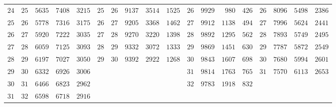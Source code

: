 \begin{GaussVISolarFrame}
\begin{tabular}{r|r|r|r|r||r|r|r|r|r||r|r|r|r||r|r|r|r}
$24$ & $25$ & $5635$ & $7408$ & $3215$ & $25$ & $26$ & $9137$ & $3514$ & $1525$ & $26$ & $9929$ & $980$ & $426$ & $26$ & $8096$ & $5498$ & $2386$\\
$25$ & $26$ & $5778$ & $7316$ & $3175$ & $26$ & $27$ & $9205$ & $3368$ & $1462$ & $27$ & $9912$ & $1138$ & $494$ & $27$ & $7996$ & $5624$ & $2441$\\
$26$ & $27$ & $5920$ & $7222$ & $3035$ & $27$ & $28$ & $9270$ & $3220$ & $1398$ & $28$ & $9892$ & $1295$ & $562$ & $28$ & $7893$ & $5749$ & $2495$\\
$27$ & $28$ & $6059$ & $7125$ & $3093$ & $28$ & $29$ & $9332$ & $3072$ & $1333$ & $29$ & $9869$ & $1451$ & $630$ & $29$ & $7787$ & $5872$ & $2549$\\
$28$ & $29$ & $6197$ & $7027$ & $3050$ & $29$ & $30$ & $9392$ & $2922$ & $1268$ & $30$ & $9843$ & $1607$ & $698$ & $30$ & $7680$ & $5994$ & $2601$\\[3pt]
$29$ & $30$ & $6332$ & $6926$ & $3006$ &  &  &  &  &  & $31$ & $9814$ & $1763$ & $765$ & $31$ & $7570$ & $6113$ & $2653$\\
$30$ & $31$ & $6466$ & $6823$ & $2962$ &  &  &  &  &  & $32$ & $9783$ & $1918$ & $832$ &  &  &  & \\
$31$ & $32$ & $6598$ & $6718$ & $2916$ &  &  &  &  &  &  &  &  &  &  &  &  & \\
\end{tabular}\endgroup
\end{GaussVISolarFrame}
\par\clearpage
\thispagestyle{empty}
\noindent{}%
\par\nobreak\smallskip
